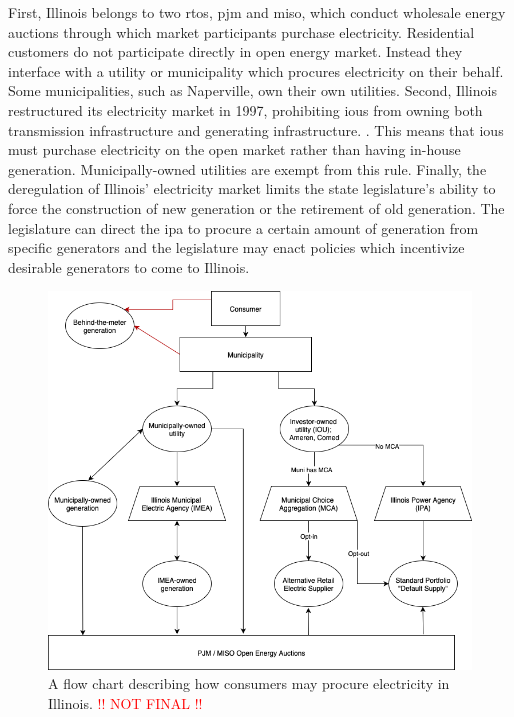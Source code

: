 First, Illinois belongs to two \acp{rto}, \ac{pjm} and \ac{miso}, which conduct
wholesale energy auctions through which market participants purchase
electricity. Residential customers do not participate directly in open energy
market. Instead they interface with a utility or municipality which procures
electricity on their behalf. Some municipalities, such as Naperville, own their
own utilities. Second, Illinois restructured its electricity market in 1997,
prohibiting \aclp{iou} from owning both transmission infrastructure and
generating infrastructure. \cite{illinois_90th_general_assembly_electric_1997}.
This means that \acp{iou} must purchase electricity on the open market rather
than having in-house generation. Municipally-owned utilities are exempt from
this rule. Finally, the deregulation of Illinois' electricity market limits the
state legislature's ability to force the construction of new generation or the
retirement of old generation. The legislature can direct the \ac{ipa} to procure
a certain amount of generation from specific generators and the legislature may
enact policies which incentivize desirable generators to come to Illinois.


\begin{figure}[ht!]
    \centering
    \includegraphics[width=0.75\columnwidth]{figures/07_interview_chapter/illinois-electric-choice.drawio.png}
    \caption{A flow chart describing how consumers may procure electricity in
    Illinois. \textcolor{red}{!! NOT FINAL !!}}
    \label{fig:illinois-flow-chart}
\end{figure}

